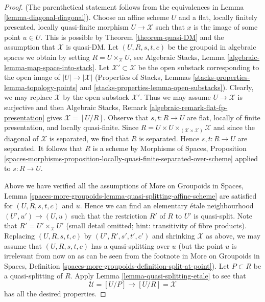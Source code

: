 \begin{proof}
(The parenthetical statement follows from the equivalences in
Lemma \ref{lemma-diagonal-diagonal}).
Choose an affine scheme $U$ and a flat, locally finitely presented,
locally quasi-finite morphism $U \to \mathcal{X}$ such that $x$
is the image of some point $u \in U$. This is possible by
Theorem \ref{theorem-quasi-DM} and the assumption that $\mathcal{X}$
is quasi-DM. Let $(U, R, s, t, c)$ be the groupoid in algebraic spaces
we obtain by setting $R = U \times_\mathcal{X} U$, see
Algebraic Stacks, Lemma \ref{algebraic-lemma-map-space-into-stack}.
Let $\mathcal{X}' \subset \mathcal{X}$ be the open substack corresponding
to the open image of $|U| \to |\mathcal{X}|$
(Properties of Stacks, Lemmas
\ref{stacks-properties-lemma-topology-points} and
\ref{stacks-properties-lemma-open-substacks}).
Clearly, we may replace $\mathcal{X}$ by the open substack $\mathcal{X}'$.
Thus we may assume $U \to \mathcal{X}$ is surjective and then
Algebraic Stacks, Remark \ref{algebraic-remark-flat-fp-presentation}
gives $\mathcal{X} = [U/R]$.
Observe that $s, t : R \to U$ are flat, locally of finite presentation,
and locally quasi-finite.
Since $R = U \times U \times_{(\mathcal{X} \times \mathcal{X})} \mathcal{X}$
and since the diagonal of $\mathcal{X}$ is separated, we find that
$R$ is separated. Hence $s, t : R \to U$ are separated. It follows
that $R$ is a scheme by
Morphisms of Spaces, Proposition
\ref{spaces-morphisms-proposition-locally-quasi-finite-separated-over-scheme}
applied to $s : R \to U$.

\medskip\noindent
Above we have verified all the assumptions of
More on Groupoids in Spaces, Lemma
\ref{spaces-more-groupoids-lemma-quasi-splitting-affine-scheme}
are satisfied for $(U, R, s, t, c)$ and $u$.
Hence we can find an elementary \'etale neighbourhood
$(U', u') \to (U, u)$ such that the restriction $R'$ of $R$ to $U'$
is quasi-split. Note that $R' = U' \times_\mathcal{X} U'$
(small detail omitted; hint: transitivity of fibre products).
Replacing $(U, R, s, t, c)$ by $(U', R', s', t', c')$ and shrinking
$\mathcal{X}$ as above, we may assume that $(U, R, s, t, c)$ has
a quasi-splitting over $u$ (but the point $u$ is irrelevant from
now on as can be seen from the footnote in
More on Groupoids in Spaces, Definition
\ref{spaces-more-groupoids-definition-split-at-point}).
Let $P \subset R$ be a quasi-splitting of $R$.
Apply Lemma \ref{lemma-quasi-splitting-etale}
to see that
$$
\mathcal{U} = [U/P] \longrightarrow [U/R] = \mathcal{X}
$$
has all the desired properties.
\end{proof}










